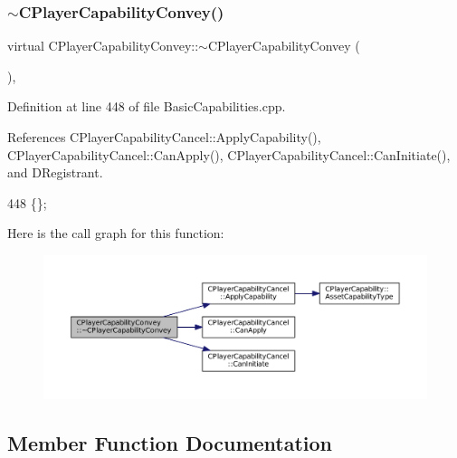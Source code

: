 \subsubsection{\texorpdfstring{$\sim$\+C\+Player\+Capability\+Convey()}{~CPlayerCapabilityConvey()}}
{\footnotesize\ttfamily virtual C\+Player\+Capability\+Convey\+::$\sim$\+C\+Player\+Capability\+Convey (\begin{DoxyParamCaption}{ }\end{DoxyParamCaption})\hspace{0.3cm}{\ttfamily [inline]}, {\ttfamily [virtual]}}



Definition at line 448 of file Basic\+Capabilities.\+cpp.



References C\+Player\+Capability\+Cancel\+::\+Apply\+Capability(), C\+Player\+Capability\+Cancel\+::\+Can\+Apply(), C\+Player\+Capability\+Cancel\+::\+Can\+Initiate(), and D\+Registrant.


\begin{DoxyCode}
448 \{\};
\end{DoxyCode}
Here is the call graph for this function\+:\nopagebreak
\begin{figure}[H]
\begin{center}
\leavevmode
\includegraphics[width=350pt]{classCPlayerCapabilityConvey_a687e07da4e0f552bd0629183c407229f_cgraph}
\end{center}
\end{figure}


\subsection{Member Function Documentation}
\hypertarget{classCPlayerCapabilityConvey_ad05e5ab950872e685fb9449592f7f5a9}{}\label{classCPlayerCapabilityConvey_ad05e5ab950872e685fb9449592f7f5a9} 
